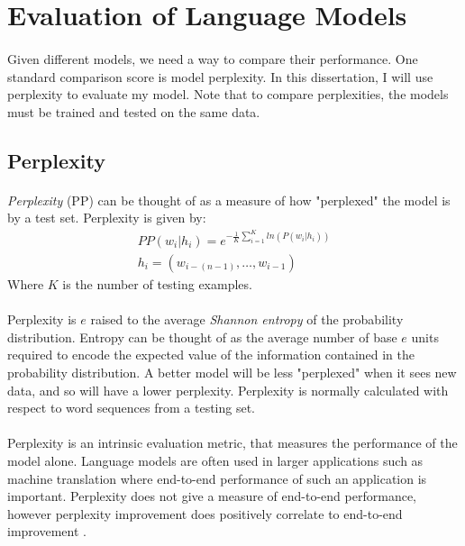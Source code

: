 \section {Evaluation of Language Models}
\paragraph{}
Given different models, we need a way to compare their performance. One standard comparison score is model perplexity. In this dissertation, I will use perplexity to evaluate my model. Note that to compare perplexities, the models must be trained and tested on the same data.
\subsection{Perplexity} \label{sec:perplexity}
\paragraph{}
\emph{Perplexity} (PP) can be thought of as a measure of how "perplexed" the model is by a test set.
Perplexity is given by:
\begin{align}
PP(w_i | h_i)=e^{- \frac{1}{K} \sum_{i=1}^K ln( P(w_i | h_i) ) } \label{eq:perplexity}
\\ h_i = ( w_{i-(n-1)},\dots, w_{i-1} ) \nonumber
\end{align}
Where $K$ is the number of testing examples. 
\paragraph{}
Perplexity is $e$ raised to the average \emph{Shannon entropy} of the probability distribution. Entropy can be thought of as the average number of base $e$ units required to encode the expected value of the information contained in the probability distribution. A better model will be less "perplexed" when it sees new data, and so will have a lower perplexity.  Perplexity is normally calculated with respect to word sequences from a testing set. 
\paragraph{}
Perplexity is an intrinsic evaluation metric, that measures the performance of the model alone. Language models are often used in larger applications such as machine translation where end-to-end performance of such an application is important. Perplexity does not give a measure of end-to-end performance, however perplexity improvement does positively correlate to end-to-end improvement \cite{Jurafsky2009}.
